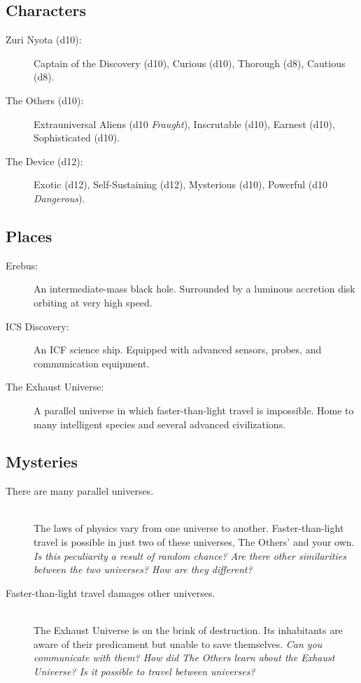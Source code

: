 \documentclass[11pt, a5paper, parskip=half-, DIV=12]{scrartcl}
\begin{document}
\newpage

\subsection*{Characters}
\begin{description}
	\item[Zuri Nyota (d10):] Captain of the Discovery (d10), Curious (d10), Thorough (d8), Cautious (d8).
	\item[The Others (d10):] Extrauniversal Aliens (d10 \textit{Fraught}), Inscrutable (d10), Earnest (d10), Sophisticated (d10).
	\item[The Device (d12):] Exotic (d12), Self-Sustaining (d12), Mysterious (d10), Powerful (d10 \textit{Dangerous}). 
\end{description}

\subsection*{Places}
\begin{description}
	\item[Erebus:] An intermediate-mass black hole. Surrounded by a luminous accretion disk orbiting at very high speed.
	\item[ICS Discovery:] An ICF science ship. Equipped with advanced sensors, probes, and communication equipment.
	\item[The Exhaust Universe:] A parallel universe in which faster-than-light travel is impossible. Home to many intelligent species and several advanced civilizations.
\end{description}

\subsection*{Mysteries}
\begin{description}
	\item[There are many parallel universes.] \phantom{a} \\ The laws of physics vary from one universe to another. Faster-than-light travel is possible in just two of these universes, The Others' and your own. \textit{Is this peculiarity a result of random chance? Are there other similarities between the two universes? How are they different?}
	\item[Faster-than-light travel damages other universes.] \phantom{a} \\ The Exhaust Universe is on the brink of destruction. Its inhabitants are aware of their predicament but unable to save themselves. \textit{Can you communicate with them? How did The Others learn about the Exhaust Universe? Is it possible to travel between universes?}
\end{description}
\end{document}
